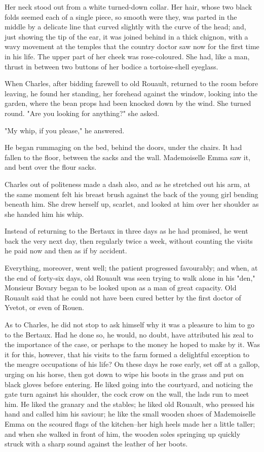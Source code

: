 \documentclass{tufte-book}
\begin{document}
Her neck stood out from a white turned-down collar. Her hair, whose
two black folds seemed each of a single piece, so smooth were they, was
parted in the middle by a delicate line that curved slightly with the
curve of the head; and, just showing the tip of the ear, it was joined
behind in a thick chignon, with a wavy movement at the temples that the
country doctor saw now for the first time in his life. The upper part of
her cheek was rose-coloured. She had, like a man, thrust in between two
buttons of her bodice a tortoise-shell eyeglass.

When Charles, after bidding farewell to old Rouault, returned to the
room before leaving, he found her standing, her forehead against the
window, looking into the garden, where the bean props had been knocked
down by the wind. She turned round. "Are you looking for anything?" she
asked.

"My whip, if you please," he answered.

He began rummaging on the bed, behind the doors, under the chairs. It
had fallen to the floor, between the sacks and the wall. Mademoiselle
Emma saw it, and bent over the flour sacks.

Charles out of politeness made a dash also, and as he stretched out his
arm, at the same moment felt his breast brush against the back of the
young girl bending beneath him. She drew herself up, scarlet, and looked
at him over her shoulder as she handed him his whip.

Instead of returning to the Bertaux in three days as he had promised,
he went back the very next day, then regularly twice a week, without
counting the visits he paid now and then as if by accident.

Everything, moreover, went well; the patient progressed favourably; and
when, at the end of forty-six days, old Rouault was seen trying to walk
alone in his "den," Monsieur Bovary began to be looked upon as a man
of great capacity. Old Rouault said that he could not have been cured
better by the first doctor of Yvetot, or even of Rouen.

As to Charles, he did not stop to ask himself why it was a pleasure
to him to go to the Bertaux. Had he done so, he would, no doubt, have
attributed his zeal to the importance of the case, or perhaps to the
money he hoped to make by it. Was it for this, however, that his visits
to the farm formed a delightful exception to the meagre occupations of
his life? On these days he rose early, set off at a gallop, urging on
his horse, then got down to wipe his boots in the grass and put on black
gloves before entering. He liked going into the courtyard, and noticing
the gate turn against his shoulder, the cock crow on the wall, the lads
run to meet him. He liked the granary and the stables; he liked old
Rouault, who pressed his hand and called him his saviour; he like the
small wooden shoes of Mademoiselle Emma on the scoured flags of the
kitchen--her high heels made her a little taller; and when she walked in
front of him, the wooden soles springing up quickly struck with a sharp
sound against the leather of her boots.
\end{document}
